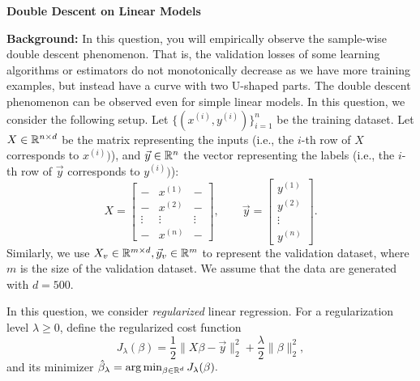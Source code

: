 \item {} {\bf Double Descent on Linear Models}

\textbf{Background: } 
In this question, you will empirically observe the sample-wise double descent phenomenon. That is, the validation losses of some learning algorithms or estimators do not monotonically decrease as we have more training examples, but instead have a curve with two U-shaped parts. The double descent phenomenon can be observed even for simple linear models. In this question, we consider the following setup. Let $\{(x^{(i)},y^{(i)})\}_{i=1}^{n}$ be the training dataset. Let $X\in\mathbb{R}^{n\times d}$ be the matrix representing the inputs (i.e., the $i$-th row of $X$ corresponds to $x^{(i)})$), and $\vec{y}\in\mathbb{R}^{n}$ the vector representing the labels (i.e., the $i$-th row of $\vec{y}$ corresponds to $y^{(i)})$):
$$
X=
\begin{bmatrix}
	- & x^{(1)} & - \\
	- & x^{(2)} & - \\
	\vdots & \vdots & \vdots\\
	- & x^{(n)} & - 
\end{bmatrix},\qquad
\vec{y}=
\begin{bmatrix}
	y^{(1)} \\
	y^{(2)}\\
	\vdots\\
	y^{(n)}
\end{bmatrix}.
$$
Similarly, we use $X_v\in \mathbb{R}^{m\times d}, \vec{y}_v\in \mathbb{R}^{m}$ to represent the validation dataset, where $m$ is the size of the validation dataset. We assume that the data are generated with $d=500$. 

In this question, we consider \emph{regularized} linear regression. For a regularization level $\lambda\ge 0$, define the regularized cost function $$J_\lambda(\beta)=\frac{1}{2}\|X\beta-\vec{y}\|_2^2+\frac{\lambda}{2}\|\beta\|_2^2,$$ and its minimizer $\hat{\beta}_\lambda=\arg\min_{\beta\in \mathbb{R}^{d}}J_\lambda(\beta).$

\begin{enumerate}
 	
	\ifnum{} {
	
} \fi


\ifnum{} {
	
} \fi

	
	\ifnum{} {
	
	} \fi

\end{enumerate}
